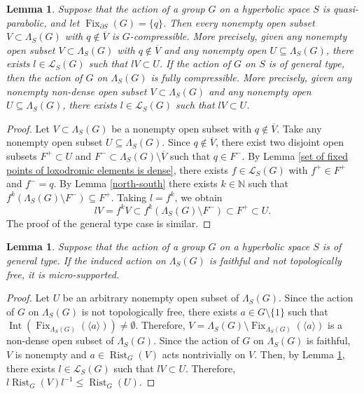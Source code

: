 \documentclass[11pt,letterpaper]{article}
\newcommand{\NN}{\mathbb{N}}
\DeclareMathOperator{\rist}{Rist}
\DeclareMathOperator{\Int}{Int}
\DeclareMathOperator{\Fix}{Fix}
\newtheorem{lem}[thm]{Lemma}
\theoremstyle{definition}
\theoremstyle{remark}
\begin{document}
\begin{lem}\label{Gen type actions admit compressible open sets}
Suppose that the action of a group $G$ on a hyperbolic space $S$ is quasi-parabolic, and let $\Fix_{\partial S}(G)=\{q\}$. Then every nonempty open subset $V \subset \Lambda_S(G)$ with $q \notin \overline{V}$ is $G$-compressible.  More precisely, given any nonempty open subset $V \subset \Lambda_S(G)$ with $q \notin \overline{V}$  and any nonempty open $U \subseteq \Lambda_S(G)$, there exists $l \in \mathcal{L}_S(G)$ such that $lV \subset U$. If the action of $G$ on $S$ is of general type, then the action of $G$ on $\Lambda_S(G)$ is fully compressible. More precisely, given any nonempty non-dense open subset $V \subset \Lambda_S(G)$ and any nonempty open $U \subseteq \Lambda_S(G)$, there exists $l \in \mathcal{L}_S(G)$ such that $lV \subset U$.
\end{lem}
\begin{proof}
Let $V \subset \Lambda_S(G)$ be a nonempty open subset with $q \notin \overline{V}$. Take any nonempty open subset $U \subseteq \Lambda_S(G)$.
Since $q \notin \overline{V}$, there exist two disjoint open subsets $F^{+} \subset U$ and $F^{-} \subset \Lambda_S(G) \setminus \overline{V}$ such that $q \in F^-$. By Lemma \ref{set of fixed points of loxodromic elements is dense}, there exists $f \in \mathcal{L}_S(G)$ with $f^+ \in F^{+}$ and $f^- = q$. By Lemma \ref{north-south} there exists $k \in \NN$ such that $f^k(\Lambda_S(G) \setminus F^-) \subseteq F^+$.
Taking $l=f^k$, we obtain 
$$lV =f^kV \subset f^k(\Lambda_S(G) \setminus F^-) \subset F^+ \subset U.$$
The proof of the general type case is similar.
\end{proof}


\begin{lem}\label{Not_top_free actions are micro-supported}
Suppose that the action of a group $G$ on a hyperbolic space $S$ is of general type. If the induced action on $\Lambda_S(G)$ is faithful and not topologically free, it is micro-supported. 
\end{lem}

\begin{proof}
Let $U$ be an arbitrary nonempty open subset of $\Lambda_S(G)$. Since the action of $G$ on $\Lambda_S(G)$ is not topologically free, there exists $a \in G \setminus\{1\}$ such that $\Int(\Fix_{\Lambda_S(G)}(\langle a \rangle)) \neq \emptyset$. Therefore, $V=\Lambda_S(G) \setminus \Fix_{\Lambda_S(G)}(\langle a \rangle)$ is a non-dense open subset of $\Lambda_S(G)$. Since the action of $G$ on $\Lambda_S(G)$ is faithful, $V$ is nonempty and $a \in \rist_G(V)$ acts nontrivially on $V$. Then, by Lemma \ref{Gen type actions admit compressible open sets}, there exists $l \in \mathcal{L}_S(G)$ such that $lV \subset U$. Therefore, $l\rist_G(V)l^{-1} \leq \rist_G(U)$. 
\end{proof}
\end{document}

